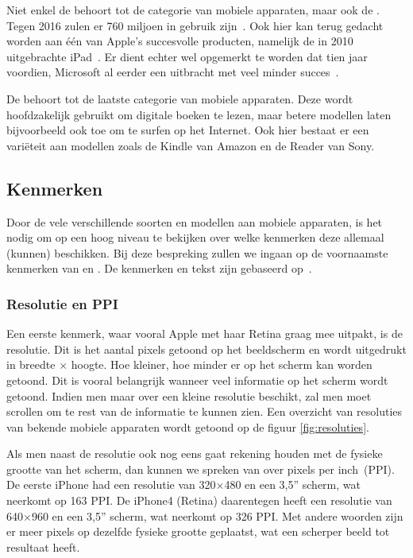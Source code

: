 Niet enkel de  behoort tot de categorie van mobiele apparaten, maar ook de . 
Tegen 2016 zulen er 760 miljoen  in gebruik zijn~\cite{Gillett2012}.
Ook hier kan terug gedacht worden aan één van Apple's succesvolle producten, namelijk de in 2010 uitgebrachte iPad~\cite{Apple2010}. 
Er dient echter wel opgemerkt te worden dat tien jaar voordien, Microsoft al eerder een  uitbracht met veel minder succes~\cite{Microsoft2000}.

De  behoort tot de laatste categorie van mobiele apparaten. 
Deze wordt hoofdzakelijk gebruikt om digitale boeken te lezen, maar betere modellen laten bijvoorbeeld ook toe om te surfen op het Internet. 
Ook hier bestaat er een variëteit aan modellen zoals de Kindle van Amazon en de Reader van Sony.

\subsection{Kenmerken}
Door de vele verschillende soorten en modellen aan mobiele apparaten, is het nodig om op een hoog niveau te bekijken over welke kenmerken deze allemaal (kunnen) beschikken. 
Bij deze bespreking zullen we ingaan op de voornaamste kenmerken van  en . De kenmerken en tekst zijn gebaseerd op~\cite{PhilDutson2012}.

\subsubsection{Resolutie en PPI}
Een eerste kenmerk, waar vooral Apple met haar Retina graag mee uitpakt, is de resolutie. 
Dit is het aantal pixels getoond op het beeldscherm en wordt uitgedrukt in breedte $\times$ hoogte. 
Hoe kleiner, hoe minder er op het scherm kan worden getoond. 
Dit is vooral belangrijk wanneer veel informatie op het scherm wordt getoond. 
Indien men maar over een kleine resolutie beschikt, zal men moet scrollen om te rest van de informatie te kunnen zien.
Een overzicht van resoluties van bekende mobiele apparaten wordt getoond op de figuur \ref{fig:resoluties}.

Als men naast de resolutie ook nog eens gaat rekening houden met de fysieke grootte van het scherm, dan kunnen we spreken van over pixels per inch~(PPI). 
De eerste iPhone had een resolutie van 320$\times$480 en een 3,5” scherm, wat neerkomt op 163 PPI. 
De iPhone4 (Retina) daarentegen heeft een resolutie van 640$\times$960 en een 3,5” scherm, wat neerkomt op 326 PPI. 
Met andere woorden zijn er meer pixels op dezelfde fysieke grootte geplaatst, wat een scherper beeld tot resultaat heeft. 

